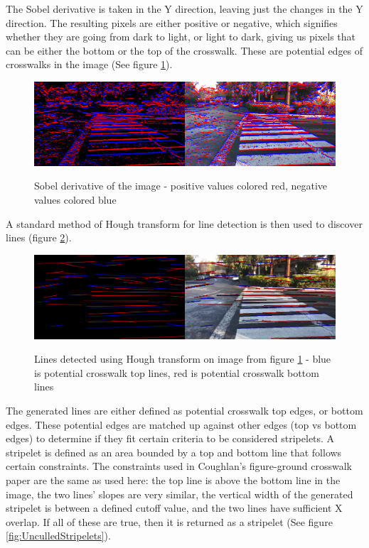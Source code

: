 \documentclass[12pt]{ucthesis}
\newcommand{\captionfonts}{\small\bf\ssp}
\begin{document}
The Sobel derivative is taken in the Y direction, leaving just the changes in the Y direction. The resulting pixels are either positive or negative, which signifies whether they are going from dark to light, or light to dark, giving us pixels that can be either the bottom or the top of the crosswalk. These are potential edges of crosswalks in the image (See figure \ref{fig:TopAndBottomSobel}). 

\begin{figure}[t]
\begin{center}
\includegraphics[width=14cm]{TopAndBottomSobel.png}
\captionfonts
\caption[Sobel Derivative of Crosswalk Image]{Sobel derivative of the image - positive values colored red, negative values colored blue}
\label{fig:TopAndBottomSobel}
\end{center}
\end{figure}

A standard method of Hough transform for line detection is then used to discover lines (figure \ref{fig:HoughLinesAfterMerge}). 

\begin{figure}[t]
\begin{center}
\includegraphics[width=14cm]{HoughLinesAfterMerge.png}
\captionfonts
\caption[Hough Line Transform Detection Result]{Lines detected using Hough transform on image from figure \ref{fig:TopAndBottomSobel} - blue is potential crosswalk top lines, red is potential crosswalk bottom lines}
\label{fig:HoughLinesAfterMerge}
\end{center}
\end{figure}

The generated lines are either defined as potential crosswalk top edges, or bottom edges. These potential edges are matched up against other edges (top vs bottom edges) to determine if they fit certain criteria to be considered stripelets. A stripelet is defined as an area bounded by a top and bottom line that follows certain constraints. The constraints used in Coughlan's figure-ground crosswalk paper \cite{Coughlan2006} are the same as used here: the top line is above the bottom line in the image, the two lines' slopes are very similar, the vertical width of the generated stripelet is between a defined cutoff value, and the two lines have sufficient X overlap. If all of these are true, then it is returned as a stripelet (See figure \ref{fig:UnculledStripelets}). 
\end{document}
